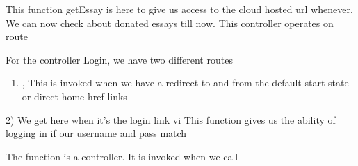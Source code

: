 \documentclass[letterpaper,10pt,english]{sphinxmanual}
\begin{document}

\begin{fulllineitems}
\label{\detokenize{main:main.getEssay}}
This function getEssay is here to give us access to the cloud hosted url whenever. We can now check about donated essays till now.
This controller operates on route 

\end{fulllineitems}


\begin{fulllineitems}
\label{\detokenize{main:main.login}}
For the controller Login, we have two different routes
\begin{enumerate}
%
\item {} 
, This is invoked when we have a redirect to and from the default start state or direct home href links

\end{enumerate}

2)  We get here when it’s the login link vi
This function gives us the ability of logging in if our username and pass match

\end{fulllineitems}


\begin{fulllineitems}
\label{\detokenize{main:main.show_index}}
The function is a controller. It is invoked when we call 

\end{fulllineitems}
\end{document}
